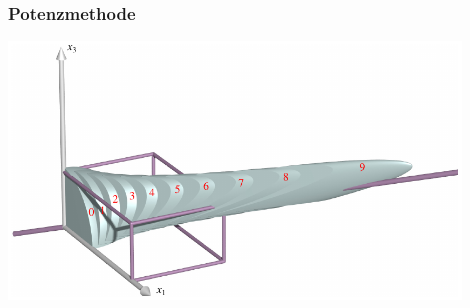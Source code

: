 %
%
%
\bgroup
\begin{frame}[t]
\setlength{\abovedisplayskip}{5pt}
\setlength{\belowdisplayskip}{5pt}
\frametitle{Potenzmethode}
\begin{center}
\includegraphics[width=0.9\textwidth]{../../buch/chapters/80-wahrscheinlichkeit/images/positiv.pdf}
\end{center}
\end{frame}
\egroup
